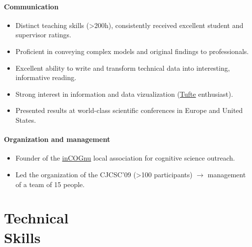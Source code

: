 \documentclass[margin,line]{resume}
\begin{document}
\begin{resume}
	\paragraph{Communication}
	\begin{itemize} \itemsep1pt \parskip0pt  \leftmargin=0em \itemindent=-1.5em
  		\item Distinct teaching skills (>200h), consistently received excellent student and supervisor ratings.
  		\item Proficient in conveying complex models and original findings to professionals.
  		\item Excellent ability to write and transform technical data into interesting, informative reading.
  		\item Strong interest in information and data vizualization (\href{http://www.edwardtufte.com/tufte/}{Tufte} enthusiast).
  		\item Presented results at world-class scientific conferences in Europe and United States.
	\end{itemize}
	
	\paragraph{Organization and management}
	\begin{itemize} \itemsep1pt \parskip0pt  \leftmargin=0em \itemindent=-1.5em
  		\item Founder of the \href{http://incognu.fr/}{inCOGnu} local association for cognitive science outreach.
  		\item Led the organization of the CJCSC'09 (>100 participants) $\rightarrow$ management of a team of 15 people.
	\end{itemize}

		
\newpage

\vspace{3mm}
    \section{\mysidestyle Technical\\Skills}


\end{resume}
\end{document}
